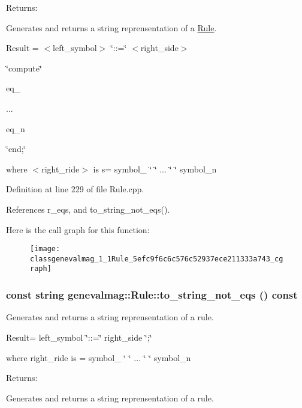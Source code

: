 \begin{Desc}
\item[Returns:]\end{Desc}
Generates and returns a string reprensentation of a \hyperlink{classgenevalmag_1_1Rule}{Rule}.\par
 \par
 Result = $<$left\_\-symbol$>$ \char`\"{}::=\char`\"{} $<$right\_\-side$>$\par
 \char`\"{}compute\char`\"{}\par
 eq\_\par
 ...\par
 eq\_\-n\par
 \char`\"{}end;\char`\"{}\par
 \par
 where $<$right\_\-ride$>$ is s= symbol\_ \char`\"{} \char`\"{} ... \char`\"{} \char`\"{} symbol\_\-n\par
 

Definition at line 229 of file Rule.cpp.

References r\_\-eqs, and to\_\-string\_\-not\_\-eqs().

Here is the call graph for this function:\nopagebreak
\begin{figure}[H]
\begin{center}
\leavevmode
\texttt{[image: classgenevalmag\_1\_1Rule\_5efc9f6c6c576c52937ece211333a743\_cgraph]}
\end{center}
\end{figure}
\hypertarget{classgenevalmag_1_1Rule_b29cbf1ccafc2585524ee9cdbe58362b}{
\subsubsection[{to\_\-string\_\-not\_\-eqs}]{\setlength{\rightskip}{0pt plus 5cm}const string genevalmag::Rule::to\_\-string\_\-not\_\-eqs () const}}
\label{classgenevalmag_1_1Rule_b29cbf1ccafc2585524ee9cdbe58362b}


Generates and returns a string reprensentation of a rule.\par
 \par
 Result= left\_\-symbol \char`\"{}::=\char`\"{} right\_\-side \char`\"{};\char`\"{}\par
 \par
 where right\_\-ride is = symbol\_ \char`\"{} \char`\"{} ... \char`\"{} \char`\"{} symbol\_\-n\par
 \par
 \begin{Desc}
\item[Returns:]\end{Desc}
Generates and returns a string reprensentation of a rule.

